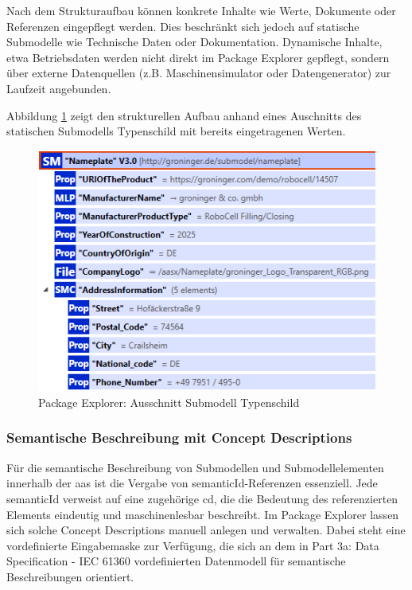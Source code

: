 Nach dem Strukturaufbau können konkrete Inhalte wie Werte, Dokumente oder Referenzen eingepflegt werden.
Dies beschränkt sich jedoch auf statische Submodelle wie Technische Daten oder Dokumentation.
Dynamische Inhalte, etwa Betriebsdaten werden nicht direkt im Package Explorer gepflegt, sondern über externe Datenquellen (z.B. Maschinensimulator oder Datengenerator) zur Laufzeit angebunden.

Abbildung \ref{fig:SubmodellTypenschild} zeigt den strukturellen Aufbau anhand eines Auschnitts des statischen Submodells Typenschild mit bereits eingetragenen Werten.

\begin{figure}[htbp]
    \centering
    \includegraphics{Bilder/ModellierungAAS/Final/SubmodellErweitert.PNG}
    \caption{Package Explorer: Ausschnitt Submodell Typenschild}
    \label{fig:SubmodellTypenschild}
\end{figure}

\subsubsection*{Semantische Beschreibung mit Concept Descriptions}
\vspace{-0.5em}

Für die semantische Beschreibung von Submodellen und Submodellelementen innerhalb der \acs{aas} ist die Vergabe von semanticId-Referenzen essenziell.
Jede semanticId verweist auf eine zugehörige \acs{cd}, die die Bedeutung des referenzierten Elements eindeutig und maschinenlesbar beschreibt.
Im Package Explorer lassen sich solche Concept Descriptions manuell anlegen und verwalten.
Dabei steht eine vordefinierte Eingabemaske zur Verfügung, die sich an dem in Part 3a: Data Specification - IEC 61360 \cite{SpezifikationPart3a} vordefinierten Datenmodell für semantische Beschreibungen orientiert.

